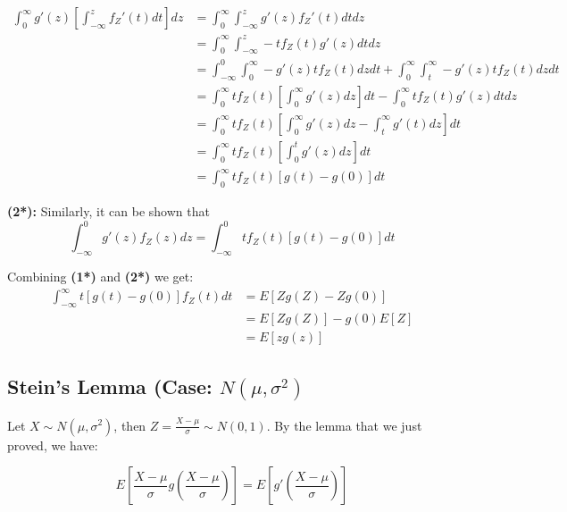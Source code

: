 \documentclass{article}
\begin{document}
\begin{equation*}
    \begin{split}
        \int_0^\infty g'(z) \left[\int_{-\infty}^z f_Z'(t) dt \right] dz &= \int_0^\infty \int_{-\infty}^z g'(z) f_Z'(t) dt dz\\
        &= \int_0^\infty \int_{-\infty}^z -t f_Z(t) g'(z)dt dz\\
        &= \int_{-\infty}^0 \int_0^\infty -g'(z) t f_Z(t) dzdt + \int_0^\infty \int_t^\infty - g'(z)tf_Z(t) dz dt\\
        &= \int_0^\infty tf_Z(t) \left[\int_0^\infty g'(z)dz \right] dt - \int_0^\infty tf_Z(t)g'(z) dt dz\\
        &= \int_0^\infty tf_Z(t) \left[ \int_0^\infty g'(z) dz - \int_t^\infty g'(t)dz \right] dt\\
        &= \int_0^\infty tf_Z(t) \left[\int_0^t g'(z) dz \right] dt\\
        &= \int_0^\infty tf_Z(t) \left[ g(t) - g(0) \right] dt
    \end{split}
\end{equation*}

\noindent \textbf{(2*):} Similarly, it can be shown that
\begin{equation*}
    \int_{-\infty}^0 g'(z) f_Z(z) dz = \int_{-\infty}^0 tf_Z(t) [g(t) - g(0)]dt
\end{equation*}

Combining \textbf{(1*)} and \textbf{(2*)} we get:
\begin{equation*}
    \begin{split}
        \int_{-\infty}^\infty t[g(t) - g(0)] f_Z(t) dt &= E[Zg(Z) - Zg(0)]\\
        &= E[Zg(Z)]- g(0)E[Z]\\
        &= E[zg(z)]
    \end{split}
\end{equation*}

\subsection{Stein's Lemma (Case: $N(\mu,\sigma^2)$}

Let $X \sim N(\mu, \sigma^2)$, then $Z = \frac{X-\mu}{\sigma} \sim N(0,1)$. By the lemma that we just proved, we have:

\begin{equation*}
    E\left[\frac{X-\mu}{\sigma}g\left(\frac{X-\mu}{\sigma} \right) \right] = E \left[g'\left(\frac{X-\mu}{\sigma}\right) \right]
\end{equation*}
\end{document}
